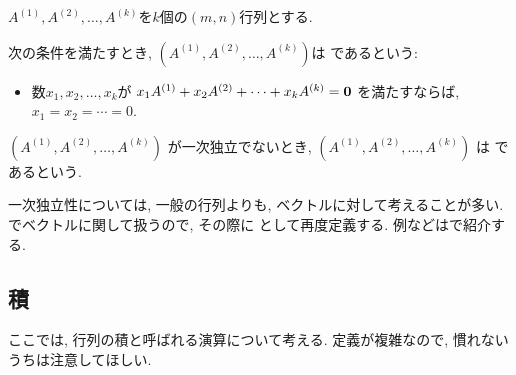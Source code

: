 \begin{definition}
  \label{def:linindep:general}
  $A^{(1)}, A^{(2)},\ldots, A^{(k)}$を$k$個の$(m,n)$行列とする.
  
  次の条件を満たすとき,
  $(A^{(1)}, A^{(2)},\ldots, A^{(k)})$は
  であるという:
  \begin{itemize}
  \item
    数$x_1,x_2,\ldots, x_k$が
    $x_1A^{(1)}+x_2A^{(2)}+\cdots+x_kA^{(k)}=\boldsymbol{0}$
    を満たすならば, $x_1=x_2=\cdots=0$.
  \end{itemize}

  $(A^{(1)}, A^{(2)},\ldots, A^{(k)})$
  が一次独立でないとき,
  $(A^{(1)}, A^{(2)},\ldots, A^{(k)})$
  は
  であるという.
\end{definition}

\begin{remark}
  一次独立性については,
  一般の行列よりも, ベクトルに対して考えることが多い.
  でベクトルに関して扱うので,
  その際に
  として再度定義する.
  例などはで紹介する.
\end{remark}

\subsection{積}
ここでは, 行列の積と呼ばれる演算について考える.
定義が複雑なので,
慣れないうちは注意してほしい.

